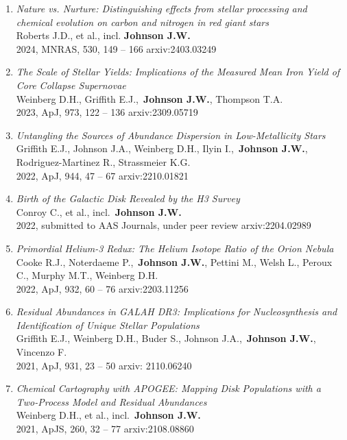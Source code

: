 \documentclass[cv.tex]{subfiles}
\begin{document}
\begin{enumerate}
	\item \textit{Nature vs. Nurture: Distinguishing effects from stellar
	processing and chemical evolution on carbon and nitrogen in red giant stars}
	\\
	Roberts J.D., et al., incl. \textbf{Johnson J.W.}
	\\
	2024, MNRAS, 530, 149 -- 166 \hfill arxiv:2403.03249

	\item \textit{The Scale of Stellar Yields: Implications of the Measured
	Mean Iron Yield of Core Collapse Supernovae}
	\\
	Weinberg D.H., Griffith E.J.,~\textbf{Johnson J.W.}, Thompson T.A.
	\\
	2023, ApJ, 973, 122 -- 136 \hfill arxiv:2309.05719

	\item \textit{Untangling the Sources of Abundance Dispersion in
	Low-Metallicity Stars}
	\\
	Griffith E.J., Johnson J.A., Weinberg D.H., Ilyin I.,~\textbf{Johnson J.W.},
	Rodriguez-Martinez R., Strassmeier K.G.
	\\
	2022, ApJ, 944, 47 -- 67 \hfill arxiv:2210.01821

	\item \textit{Birth of the Galactic Disk Revealed by the H3 Survey}
	\\
	Conroy C., et al., incl.~\textbf{Johnson J.W.}
	\\
	2022, submitted to AAS Journals, under peer review \hfill arxiv:2204.02989

	\item \textit{Primordial Helium-3 Redux: The Helium Isotope Ratio of the
	Orion Nebula}
	\\
	Cooke R.J., Noterdaeme P.,~\textbf{Johnson J.W.}, Pettini M., Welsh L.,
	Peroux C., Murphy M.T., Weinberg D.H.
	\\
	2022, ApJ, 932, 60 -- 76 \hfill arxiv:2203.11256

	\item \textit{Residual Abundances in GALAH DR3: Implications for
	Nucleosynthesis and Identification of Unique Stellar Populations}
	\\
	Griffith E.J., Weinberg D.H., Buder S., Johnson J.A.,~\textbf{Johnson J.W.},
	Vincenzo F.
	\\
	2021, ApJ, 931, 23 -- 50 \hfill arxiv: 2110.06240

	\item \textit{Chemical Cartography with APOGEE: Mapping Disk Populations
	with a Two-Process Model and Residual Abundances}
	\\
	Weinberg D.H., et al., incl.~\textbf{Johnson J.W.}
	\\
	2021, ApJS, 260, 32 -- 77 \hfill arxiv:2108.08860


\end{enumerate}
\end{document}
